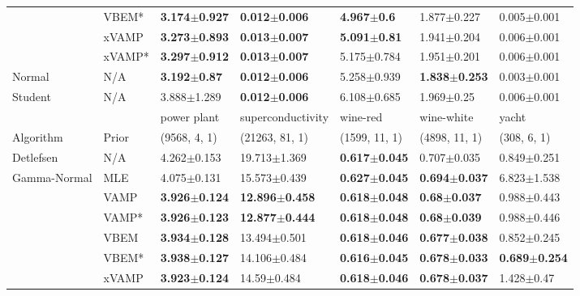 \begin{tabular}{lllllll}
        & VBEM* &  \textbf{3.174$\pm$0.927} &  \textbf{0.012$\pm$0.006} &    \textbf{4.967$\pm$0.6} &           1.877$\pm$0.227 &         0.005$\pm$0.001 \\
        & xVAMP &  \textbf{3.273$\pm$0.893} &  \textbf{0.013$\pm$0.007} &   \textbf{5.091$\pm$0.81} &           1.941$\pm$0.204 &         0.006$\pm$0.001 \\
        & xVAMP* &  \textbf{3.297$\pm$0.912} &  \textbf{0.013$\pm$0.007} &           5.175$\pm$0.784 &           1.951$\pm$0.201 &         0.006$\pm$0.001 \\
Normal & N/A &   \textbf{3.192$\pm$0.87} &  \textbf{0.012$\pm$0.006} &           5.258$\pm$0.939 &  \textbf{1.838$\pm$0.253} &         0.003$\pm$0.001 \\
Student & N/A &           3.888$\pm$1.289 &  \textbf{0.012$\pm$0.006} &           6.108$\pm$0.685 &            1.969$\pm$0.25 &         0.006$\pm$0.001 \\
\midrule
        &     &               power plant &          superconductivity &                  wine-red &                wine-white &                     yacht \\
Algorithm & Prior& (9568, 4, 1)& (21263, 81, 1)& (1599, 11, 1)& (4898, 11, 1)& (308, 6, 1)\\
\midrule
Detlefsen & N/A &           4.262$\pm$0.153 &           19.713$\pm$1.369 &  \textbf{0.617$\pm$0.045} &           0.707$\pm$0.035 &           0.849$\pm$0.251 \\
Gamma-Normal & MLE &           4.075$\pm$0.131 &           15.573$\pm$0.439 &  \textbf{0.627$\pm$0.045} &  \textbf{0.694$\pm$0.037} &           6.823$\pm$1.538 \\
        & VAMP &  \textbf{3.926$\pm$0.124} &  \textbf{12.896$\pm$0.458} &  \textbf{0.618$\pm$0.048} &   \textbf{0.68$\pm$0.037} &           0.988$\pm$0.443 \\
        & VAMP* &  \textbf{3.926$\pm$0.123} &  \textbf{12.877$\pm$0.444} &  \textbf{0.618$\pm$0.048} &   \textbf{0.68$\pm$0.039} &           0.988$\pm$0.446 \\
        & VBEM &  \textbf{3.934$\pm$0.128} &           13.494$\pm$0.501 &  \textbf{0.618$\pm$0.046} &  \textbf{0.677$\pm$0.038} &           0.852$\pm$0.245 \\
        & VBEM* &  \textbf{3.938$\pm$0.127} &           14.106$\pm$0.484 &  \textbf{0.616$\pm$0.045} &  \textbf{0.678$\pm$0.033} &  \textbf{0.689$\pm$0.254} \\
        & xVAMP &  \textbf{3.923$\pm$0.124} &            14.59$\pm$0.484 &  \textbf{0.618$\pm$0.046} &  \textbf{0.678$\pm$0.037} &            1.428$\pm$0.47 \\

\end{tabular}
